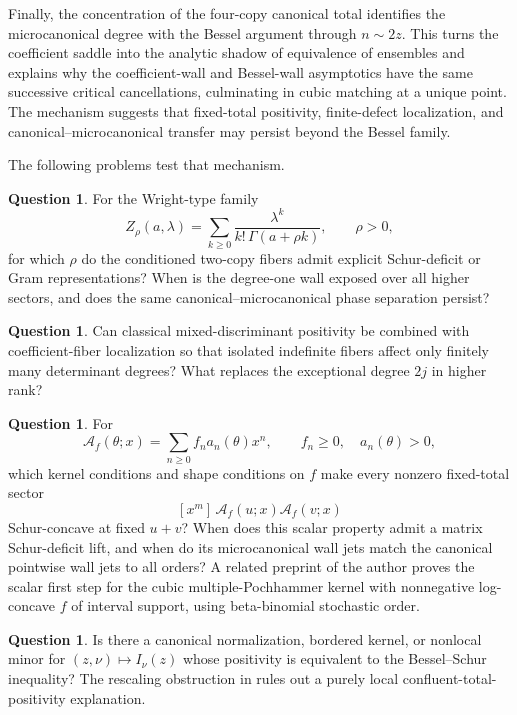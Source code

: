 \documentclass[11pt,a4paper]{amsart}
\numberwithin{equation}{section}
\theoremstyle{plain}
\theoremstyle{definition}
\newtheorem{question}[theorem]{Question}
\begin{document}
Finally, the concentration of the four-copy canonical total identifies the
microcanonical degree with the Bessel argument through \(n\sim2z\).  This turns
the coefficient saddle into the analytic shadow of equivalence of ensembles
and explains why the coefficient-wall and Bessel-wall asymptotics have the same
successive critical cancellations, culminating in cubic matching at a unique
point.  The mechanism suggests that fixed-total positivity, finite-defect
localization, and canonical--microcanonical transfer may persist beyond the
Bessel family.

The following problems test that mechanism.

\begin{question}\label{q:wright}
For the Wright-type family
\[
 Z_\rho(a,\lambda)=\sum_{k\ge0}\frac{\lambda^k}{k!\,\Gamma(a+\rho k)},
 \qquad \rho>0,
\]
for which \(\rho\) do the conditioned two-copy fibers admit explicit
Schur-deficit or Gram representations?  When is the degree-one wall exposed
over all higher sectors, and does the same canonical--microcanonical phase
separation persist?
\end{question}

\begin{question}\label{q:higher-rank}
Can classical mixed-discriminant positivity
\cite{Bapat1989MixedDiscriminants} be combined with coefficient-fiber
localization so that isolated indefinite fibers affect only finitely many
determinant degrees?  What replaces the exceptional degree \(2j\) in higher
rank?
\end{question}

\begin{question}\label{q:saddle-transfer}
For
\[
 \mathcal A_f(\theta;x)=\sum_{n\ge0}f_na_n(\theta)x^n,
 \qquad f_n\ge0,\quad a_n(\theta)>0,
\]
which kernel conditions and shape conditions on \(f\) make every nonzero
fixed-total sector
\[
 [x^m]\,\mathcal A_f(u;x)\mathcal A_f(v;x)
\]
Schur-concave at fixed \(u+v\)?  When does this scalar property admit a
matrix Schur-deficit lift, and when do its microcanonical wall jets match the
canonical pointwise wall jets to all orders?  A related preprint of the author
\cite{Shields2026Cubic} proves the scalar first step for the cubic
multiple-Pochhammer kernel with nonnegative log-concave \(f\) of interval
support, using beta-binomial stochastic order.
\end{question}

\begin{question}\label{q:tp-origin}
Is there a canonical normalization, bordered kernel, or nonlocal minor for
\((z,\nu)\mapsto I_\nu(z)\) whose positivity is equivalent to the
Bessel--Schur inequality?  The rescaling obstruction in
 rules out a purely local
confluent-total-positivity explanation.
\end{question}
\end{document}
